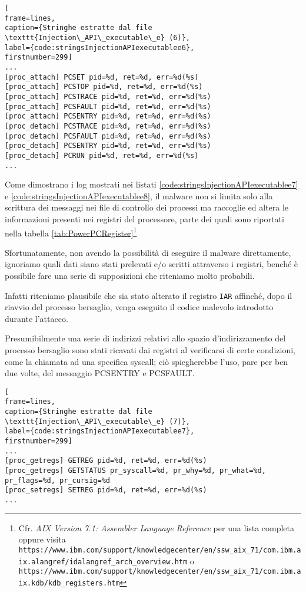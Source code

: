 \documentclass[10pt,a4paper, titlepage]{report}
\begin{document}
\begin{lstlisting}[
frame=lines, 
caption={Stringhe estratte dal file \texttt{Injection\_API\_executable\_e} (6)}, 
label={code:stringsInjectionAPIexecutablee6},
firstnumber=299]
...
[proc_attach] PCSET pid=%d, ret=%d, err=%d(%s)
[proc_attach] PCSTOP pid=%d, ret=%d, err=%d(%s)
[proc_attach] PCSTRACE pid=%d, ret=%d, err=%d(%s)
[proc_attach] PCSFAULT pid=%d, ret=%d, err=%d(%s)
[proc_attach] PCSENTRY pid=%d, ret=%d, err=%d(%s)
[proc_detach] PCSTRACE pid=%d, ret=%d, err=%d(%s)
[proc_detach] PCSFAULT pid=%d, ret=%d, err=%d(%s)
[proc_detach] PCSENTRY pid=%d, ret=%d, err=%d(%s)
[proc_detach] PCRUN pid=%d, ret=%d, err=%d(%s)
...
\end{lstlisting}

Come dimostrano i log mostrati nei listati \ref{code:stringsInjectionAPIexecutablee7} e \ref{code:stringsInjectionAPIexecutablee8}, il malware non si limita solo alla scrittura dei messaggi nei file di controllo dei processi ma raccoglie ed altera le informazioni presenti nei registri del processore, parte dei quali sono riportati nella tabella \ref{tab:PowerPCRegister}\footnote{Cfr. \textit{AIX Version 7.1: Assembler Language Reference} per una lista completa oppure visita \texttt{https://www.ibm.com/support/knowledgecenter/en/ssw\_aix\_71/com.ibm.aix.alangref/idalangref\_arch\_overview.htm} o \texttt{https://www.ibm.com/support/knowledgecenter/en/ssw\_aix\_71/com.ibm.aix.kdb/kdb\_registers.htm}}

Sfortunatamente, non avendo la possibilità di eseguire il malware direttamente, ignoriamo quali dati siano stati prelevati e/o scritti attraverso i registri, benché è possibile fare una serie di supposizioni che riteniamo molto probabili.

Infatti riteniamo plausibile che sia stato alterato il registro \texttt{IAR} affinché, dopo il riavvio del processo bersaglio, venga eseguito il codice malevolo introdotto durante l'attacco. 

Presumibilmente una serie di indirizzi relativi allo spazio d'indirizzamento del processo bersaglio sono stati ricavati dai registri al verificarsi di certe condizioni, come la chiamata ad una specifica syscall; ciò spiegherebbe l'uso, pare per ben due volte, del messaggio PCSENTRY e PCSFAULT.  

\begin{lstlisting}[
frame=lines, 
caption={Stringhe estratte dal file \texttt{Injection\_API\_executable\_e} (7)}, 
label={code:stringsInjectionAPIexecutablee7},
firstnumber=299]
...
[proc_getregs] GETREG pid=%d, ret=%d, err=%d(%s)
[proc_getregs] GETSTATUS pr_syscall=%d, pr_why=%d, pr_what=%d, pr_flags=%d, pr_cursig=%d
[proc_setregs] SETREG pid=%d, ret=%d, err=%d(%s)
...
\end{lstlisting}
\end{document}

